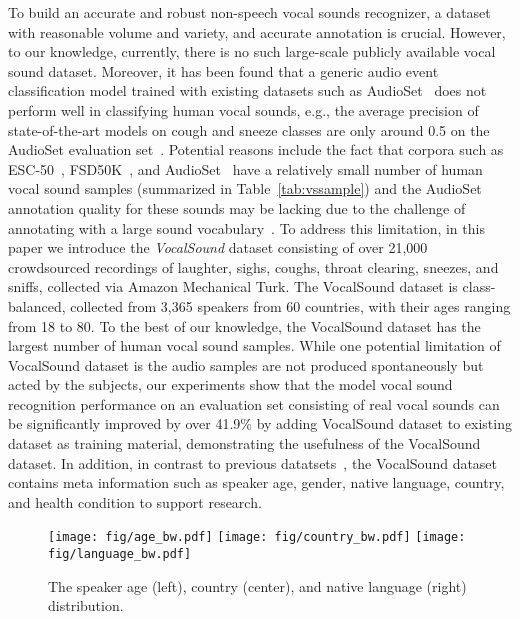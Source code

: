 \documentclass{article}
\newcommand{\squeezeup}{\vspace{-1.6mm}}
\begin{document}
To build an accurate and robust non-speech vocal sounds recognizer, a dataset with reasonable volume and variety, and accurate annotation is crucial. However, to our knowledge, currently, there is no such large-scale publicly available vocal sound dataset. Moreover, it has been found that a generic audio event classification model trained with existing datasets such as AudioSet~\cite{gemmeke2017audio} does not perform well in classifying human vocal sounds, e.g., the average precision of state-of-the-art models on cough and sneeze classes are only around 0.5 on the AudioSet evaluation set~\cite{kong2020panns,gong2021psla}.  Potential reasons include the fact that corpora such as ESC-50~\cite{piczak2015esc}, FSD50K~\cite{fonseca2020fsd50k}, and AudioSet~\cite{gemmeke2017audio} have a relatively small number of human vocal sound samples (summarized in Table~\ref{tab:vssample}) and the AudioSet annotation quality for these sounds may be lacking due to the challenge of annotating with a large sound vocabulary~\cite{gong2021psla,fonseca2020addressing,shah2018closer}. To address this limitation, in this paper we introduce the \emph{VocalSound} dataset consisting of over 21,000 crowdsourced recordings of laughter, sighs, coughs, throat clearing, sneezes, and sniffs, collected via Amazon Mechanical Turk. The VocalSound dataset is class-balanced, collected from 3,365 speakers from 60 countries, with their ages ranging from 18 to 80. To the best of our knowledge, the VocalSound dataset has the largest number of human vocal sound samples. While one potential limitation of VocalSound dataset is the audio samples are not produced spontaneously but acted by the subjects, our experiments show that the model vocal sound recognition performance on an evaluation set consisting of real vocal sounds can be significantly improved by over 41.9\% by adding VocalSound dataset to existing dataset as training material, demonstrating the usefulness of the VocalSound dataset. In addition, in contrast to previous datatsets~\cite{piczak2015esc,fonseca2020fsd50k,gemmeke2017audio}, the VocalSound dataset contains meta information such as speaker age, gender, native language, country, and health condition to support research.



\begin{figure*}[t]
  \texttt{[image: fig/age\_bw.pdf]}
\endminipage\hfill
{}
  \texttt{[image: fig/country\_bw.pdf]}
\endminipage\hfill
{}\texttt{[image: fig/language\_bw.pdf]}
\endminipage
\caption{The speaker age (left), country (center), and native language (right) distribution.}
\label{fig:dist}
\squeezeup\squeezeup
\end{figure*}
\end{document}
